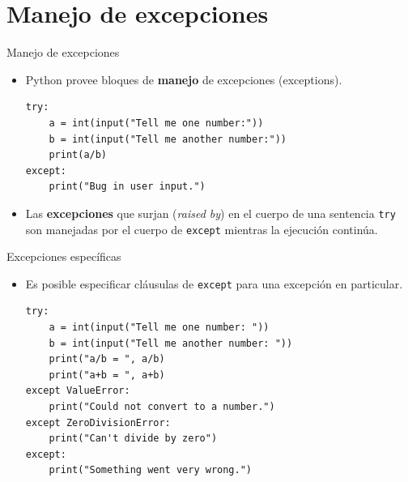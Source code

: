 \documentclass[mathserif]{beamer}
\begin{document}





\section{Manejo de excepciones}


\begin{frame}[fragile]{Manejo de excepciones}
    \begin{itemize}
        \item Python provee bloques de {\blue\bfseries manejo} de excepciones (exceptions).
\begin{lstlisting}
try:
    a = int(input("Tell me one number:"))
    b = int(input("Tell me another number:"))
    print(a/b)
except:
    print("Bug in user input.")
\end{lstlisting}

        \item Las {\orange\bfseries excepciones} que surjan (\textit{raised by}) en el cuerpo de una sentencia \lstinline|try| son manejadas por el cuerpo de \lstinline|except| mientras {\blue la ejecución continúa}.
    \end{itemize}
\end{frame}

\begin{frame}[fragile]{Excepciones específicas}
    \begin{itemize}
        \item Es posible especificar cláusulas de \lstinline|except| para una excepción en particular. 
\begin{lstlisting}
try:
    a = int(input("Tell me one number: "))
    b = int(input("Tell me another number: "))
    print("a/b = ", a/b)
    print("a+b = ", a+b)
except ValueError:
    print("Could not convert to a number.")
except ZeroDivisionError:
    print("Can't divide by zero")
except:
    print("Something went very wrong.")
\end{lstlisting}

    \end{itemize}
\end{frame}
\end{document}
